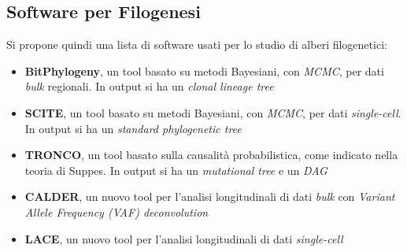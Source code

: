 \documentclass[a4paper,12pt, oneside]{book}
\begin{document}
\subsection{Software per Filogenesi}
Si propone quindi una lista di software usati per lo studio di alberi
filogenetici:
\begin{itemize}
  \item \textbf{BitPhylogeny}, un tool basato su metodi Bayesiani, con
  \textit{MCMC}, per dati \textit{bulk} regionali. In output si ha un
  \textit{clonal lineage tree}
  \item \textbf{SCITE}, un tool basato su metodi Bayesiani, con
  \textit{MCMC}, per dati \textit{single-cell}. In output si ha un
  \textit{standard phylogenetic tree}
  \item \textbf{TRONCO}, un tool basato sulla causalità probabilistica, come
  indicato nella teoria di Suppes. In output si ha un \textit{mutational tree} e
  un \textit{DAG}
  \item \textbf{CALDER}, un nuovo tool per l'analisi longitudinali di dati
  \textit{bulk} con \textit{Variant Allele Frequency (\emph{VAF})
    deconvolution} 
  \item \textbf{LACE}, un nuovo tool per l'analisi longitudinali di dati
  \textit{single-cell} 
\end{itemize}
\end{document}
